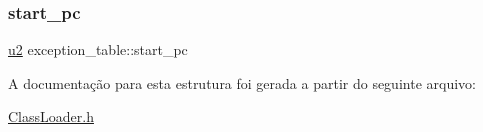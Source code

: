 \subsubsection{\texorpdfstring{start\+\_\+pc}{start\_pc}}
{\footnotesize\ttfamily \hyperlink{ClassLoader_8h_a5f223212eef04d10a4550ded680cb1cf}{u2} exception\+\_\+table\+::start\+\_\+pc}



A documentação para esta estrutura foi gerada a partir do seguinte arquivo\+:\begin{DoxyCompactItemize}
\item 
\hyperlink{ClassLoader_8h}{Class\+Loader.\+h}\end{DoxyCompactItemize}
